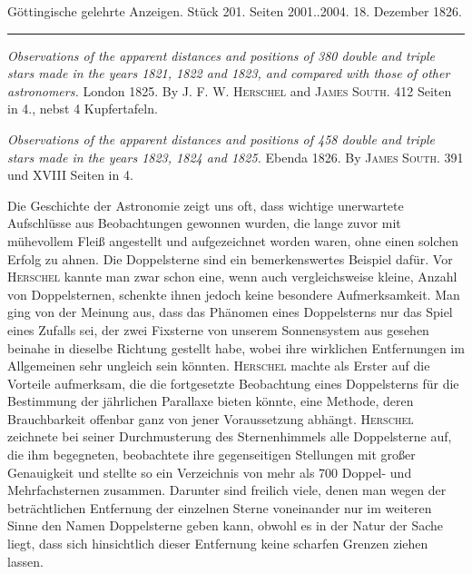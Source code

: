 \clearpage
{}
\hypertarget{native-647-lower}{}
\begin{center}\small Göttingische gelehrte Anzeigen. Stück 201. Seiten 2001..2004. 18. Dezember 1826.\\[3pt]\rule{.72\linewidth}{.3pt}\end{center}

\emph{Observations of the apparent distances and positions of \textup{380} double and triple stars made in the years \textup{1821}, \textup{1822} and \textup{1823}, and compared with those of other astronomers.} London 1825. By \textsc{J. F. W. Herschel} and \textsc{James South}. 412 Seiten in 4., nebst 4 Kupfertafeln.

\emph{Observations of the apparent distances and positions of \textup{458} double and triple stars made in the years \textup{1823}, \textup{1824} and \textup{1825}.} Ebenda 1826. By \textsc{James South}. 391 und XVIII Seiten in 4.

\begingroup\baselineskip=12.5pt\relax
Die Geschichte der Astronomie zeigt uns oft, dass wichtige unerwartete Aufschlüsse aus Beobachtungen gewonnen wurden, die lange zuvor mit mühevollem Fleiß angestellt und aufgezeichnet worden waren, ohne einen solchen Erfolg zu ahnen. Die Doppelsterne sind ein bemerkenswertes Beispiel dafür. Vor \textsc{Herschel} kannte man zwar schon eine, wenn auch vergleichsweise kleine, Anzahl von Doppelsternen, schenkte ihnen jedoch keine besondere Aufmerksamkeit. Man ging von der Meinung aus, dass das Phänomen eines Doppelsterns nur das Spiel eines Zufalls sei, der zwei Fixsterne von unserem Sonnensystem aus gesehen beinahe in dieselbe Richtung gestellt habe, wobei ihre wirklichen Entfernungen im Allgemeinen sehr ungleich sein könnten. \textsc{Herschel} machte als Erster auf die Vorteile aufmerksam, die die fortgesetzte Beobachtung eines Doppelsterns für die Bestimmung der jährlichen Parallaxe bieten könnte, eine Methode, deren Brauchbarkeit offenbar ganz von jener Voraussetzung abhängt. \textsc{Herschel} zeichnete bei seiner Durchmusterung des Sternenhimmels alle Doppelsterne auf, die ihm begegneten, beobachtete ihre gegenseitigen Stellungen mit großer Genauigkeit und stellte so ein Verzeichnis von mehr als 700 Doppel- und Mehrfachsternen zusammen. Darunter sind freilich viele, denen man wegen der beträchtlichen Entfernung der einzelnen Sterne voneinander nur im weiteren Sinne den Namen Doppelsterne geben kann, obwohl es in der Natur der Sache liegt, dass sich hinsichtlich dieser Entfernung keine scharfen Grenzen ziehen lassen.

